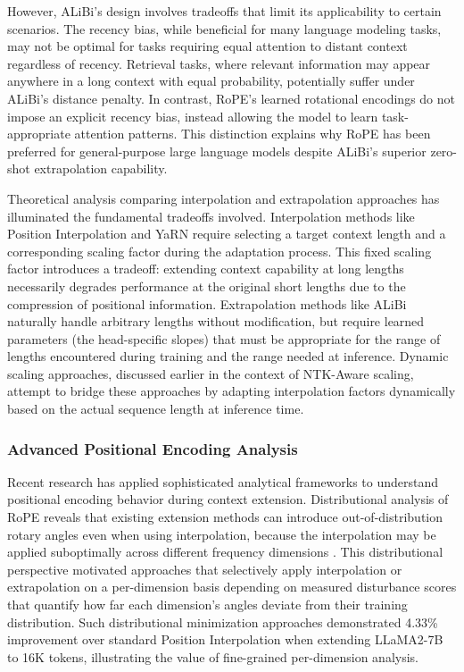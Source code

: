 However, ALiBi's design involves tradeoffs that limit its applicability to certain scenarios. The recency bias, while beneficial for many language modeling tasks, may not be optimal for tasks requiring equal attention to distant context regardless of recency. Retrieval tasks, where relevant information may appear anywhere in a long context with equal probability, potentially suffer under ALiBi's distance penalty. In contrast, RoPE's learned rotational encodings do not impose an explicit recency bias, instead allowing the model to learn task-appropriate attention patterns. This distinction explains why RoPE has been preferred for general-purpose large language models despite ALiBi's superior zero-shot extrapolation capability.

Theoretical analysis comparing interpolation and extrapolation approaches has illuminated the fundamental tradeoffs involved. Interpolation methods like Position Interpolation and YaRN require selecting a target context length and a corresponding scaling factor during the adaptation process. This fixed scaling factor introduces a tradeoff: extending context capability at long lengths necessarily degrades performance at the original short lengths due to the compression of positional information. Extrapolation methods like ALiBi naturally handle arbitrary lengths without modification, but require learned parameters (the head-specific slopes) that must be appropriate for the range of lengths encountered during training and the range needed at inference. Dynamic scaling approaches, discussed earlier in the context of NTK-Aware scaling, attempt to bridge these approaches by adapting interpolation factors dynamically based on the actual sequence length at inference time.

\subsubsection{Advanced Positional Encoding Analysis}

Recent research has applied sophisticated analytical frameworks to understand positional encoding behavior during context extension. Distributional analysis of RoPE reveals that existing extension methods can introduce out-of-distribution rotary angles even when using interpolation, because the interpolation may be applied suboptimally across different frequency dimensions \citep{zhang2024distributional}. This distributional perspective motivated approaches that selectively apply interpolation or extrapolation on a per-dimension basis depending on measured disturbance scores that quantify how far each dimension's angles deviate from their training distribution. Such distributional minimization approaches demonstrated 4.33\% improvement over standard Position Interpolation when extending LLaMA2-7B to 16K tokens, illustrating the value of fine-grained per-dimension analysis.

